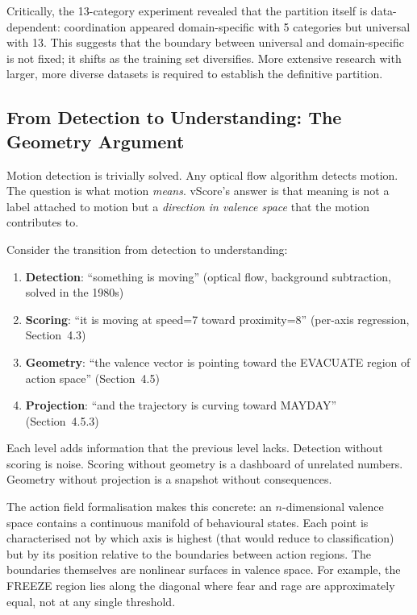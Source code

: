 \documentclass[11pt]{article}
\begin{document}
Critically, the 13-category experiment revealed that the partition itself is data-dependent: coordination appeared domain-specific with 5 categories but universal with 13. This suggests that the boundary between universal and domain-specific is not fixed; it shifts as the training set diversifies. More extensive research with larger, more diverse datasets is required to establish the definitive partition.

\subsection{From Detection to Understanding: The Geometry Argument}

Motion detection is trivially solved. Any optical flow algorithm detects motion. The question is what motion \emph{means}. vScore's answer is that meaning is not a label attached to motion but a \emph{direction in valence space} that the motion contributes to.

Consider the transition from detection to understanding:

\begin{enumerate}
    \item \textbf{Detection}: ``something is moving'' (optical flow, background subtraction, solved in the 1980s)
    \item \textbf{Scoring}: ``it is moving at speed=7 toward proximity=8'' (per-axis regression, Section~4.3)
    \item \textbf{Geometry}: ``the valence vector is pointing toward the EVACUATE region of action space'' (Section~4.5)
    \item \textbf{Projection}: ``and the trajectory is curving toward MAYDAY'' (Section~4.5.3)
\end{enumerate}

Each level adds information that the previous level lacks. Detection without scoring is noise. Scoring without geometry is a dashboard of unrelated numbers. Geometry without projection is a snapshot without consequences.

The action field formalisation makes this concrete: an $n$-dimensional valence space contains a continuous manifold of behavioural states. Each point is characterised not by which axis is highest (that would reduce to classification) but by its position relative to the boundaries between action regions. The boundaries themselves are nonlinear surfaces in valence space. For example, the FREEZE region lies along the diagonal where fear and rage are approximately equal, not at any single threshold.
\end{document}
